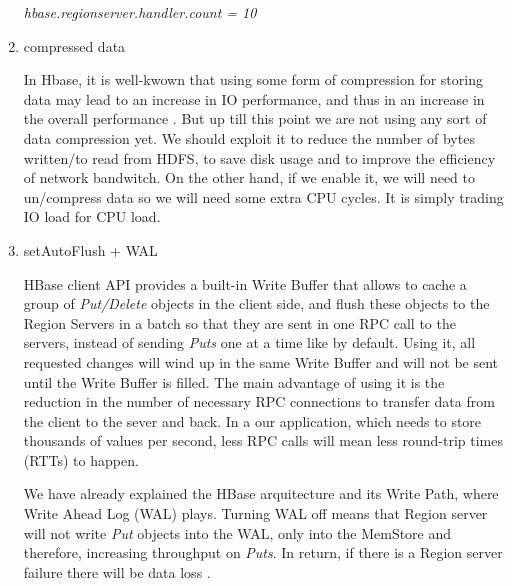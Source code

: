 \begin{enumerate}
\centerline{\textit{hbase.regionserver.handler.count = 10}}

\item compressed data

In Hbase, it is well-kwown that using some form of compression for storing data may lead to an increase in IO performance, and thus in an increase in the overall performance \cite{ApacheHBaseCompression}. But up till this point we are not using any sort of data compression yet. We should exploit it to reduce the number of bytes written/to read from HDFS, to save disk usage and to improve the efficiency of network bandwitch. On the other hand, if we enable it, we will need to un/compress data so we will need some extra CPU cycles. It is simply trading IO load for CPU load.
\par
{}


 \item setAutoFlush + WAL
\par
HBase client API provides a built-in Write Buffer that allows to cache a group of \textit{Put/Delete} objects in the client side, and flush these objects to the Region Servers in a batch so that they are sent in one RPC call to the servers, instead of sending \textit{Puts} one at a time like by default. Using it, all requested changes will wind up in the same Write Buffer and will not be sent until the Write Buffer is filled. The main advantage of using it is the reduction in the number of necessary RPC connections to transfer data from the client to the sever and back. In a our application, which needs to store thousands of values per second, less RPC calls will mean less round-trip times (RTTs) to happen.
\par
{}
\par
We have already explained the HBase arquitecture and its Write Path, where Write Ahead Log (WAL) plays. Turning WAL off means that Region server will not write \textit{Put} objects into the WAL, only into the MemStore and therefore, increasing throughput on \textit{Puts}. In return, if there is a Region server failure there will be data loss \cite{ApacheHBaseWAL}.


\end{enumerate}



